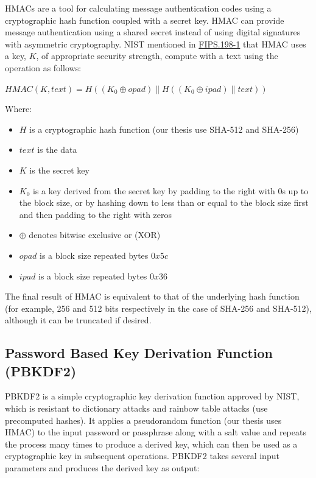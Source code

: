 HMACs are a tool for calculating message authentication codes using a cryptographic hash function coupled with a secret key. HMAC can provide message authentication using a shared secret instead of using digital signatures with asymmetric cryptography. NIST mentioned in \href{https://nvlpubs.nist.gov/nistpubs/FIPS/NIST.FIPS.198-1.pdf}{FIPS.198-1} that HMAC uses a key, $K$, of appropriate security strength, compute with a text using the operation as follows:
\vspace{0.2cm}
\begin{center}
  $HMAC(K, text) = H((K_0 \oplus opad )\| H((K_0 \oplus ipad) \| text))$
\end{center}
\vspace{0.2cm}

Where:

\begin{itemize}
  \item $H$ is a cryptographic hash function (our thesis use SHA-512 and SHA-256)
  \item $text$ is the data
  \item $K$ is the secret key
  \item $K_0$ is a key derived from the secret key by padding to the right with 0s up to the block size, or by hashing down to less than or equal to the block size first and then padding to the right with zeros
  \item $\oplus$ denotes bitwise exclusive or (XOR)
  \item $opad$ is a block size repeated bytes $0x5c$
  \item $ipad$ is a block size repeated bytes $0x36$
\end{itemize}

The final result of HMAC is equivalent to that of the underlying hash function (for example, 256 and 512 bits respectively in the case of SHA-256 and SHA-512), although it can be truncated if desired.

\subsection{Password Based Key Derivation Function (PBKDF2)}

PBKDF2 is a simple cryptographic key derivation function approved by NIST, which is resistant to dictionary attacks and rainbow table attacks (use precomputed hashes). It applies a pseudorandom function (our thesis uses HMAC) to the input password or passphrase along with a salt value and repeats the process many times to produce a derived key, which can then be used as a cryptographic key in subsequent operations. PBKDF2 takes several input parameters and produces the derived key as output:

